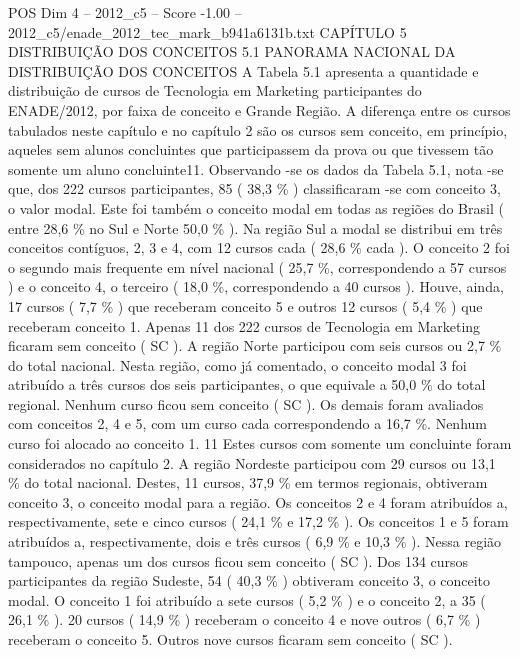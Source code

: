 \begin{textsample}{POS Dim 4 – 2012\_c5 – Score -1.00 – 2012\_c5/enade\_2012\_tec\_mark\_b941a6131b.txt}  \label{ex:f4_pos_252}
CAPÍTULO 5 DISTRIBUIÇÃO DOS CONCEITOS 5.1 PANORAMA NACIONAL DA DISTRIBUIÇÃO DOS CONCEITOS A Tabela 5.1 apresenta a quantidade e distribuição de cursos de Tecnologia em Marketing participantes do ENADE/2012, por faixa de conceito e Grande Região.
A diferença entre os cursos tabulados neste capítulo e no capítulo 2 são os cursos sem conceito, em princípio, aqueles sem alunos concluintes que participassem da prova ou que tivessem tão somente um aluno concluinte11.
Observando -se os dados da Tabela 5.1, nota -se que, dos 222 cursos participantes, 85 ( 38,3 \% ) classificaram -se com conceito 3, o valor modal.
Este foi também o conceito modal em todas as regiões do Brasil ( entre 28,6 \% no Sul e Norte 50,0 \% ).
Na região Sul a modal se distribui em três conceitos contíguos, 2, 3 e 4, com 12 cursos cada ( 28,6 \% cada ).
O conceito 2 foi o segundo mais frequente em nível nacional ( 25,7 \%, correspondendo a 57 cursos ) e o conceito 4, o terceiro ( 18,0 \%, correspondendo a 40 cursos ).
Houve, ainda, 17 cursos ( 7,7 \% ) que receberam conceito 5 e outros 12 cursos ( 5,4 \% ) que receberam conceito 1.
Apenas 11 dos 222 cursos de Tecnologia em Marketing ficaram sem conceito ( SC ).
A região Norte participou com seis cursos ou 2,7 \% do total nacional.
Nesta região, como já comentado, o conceito modal 3 foi atribuído a três cursos dos seis participantes, o que equivale a 50,0 \% do total regional.
Nenhum curso ficou sem conceito ( SC ).
Os demais foram avaliados com conceitos 2, 4 e 5, com um curso cada correspondendo a 16,7 \%.
Nenhum curso foi alocado ao conceito 1. 11 Estes cursos com somente um concluinte foram considerados no capítulo 2.
A região Nordeste participou com 29 cursos ou 13,1 \% do total nacional.
Destes, 11 cursos, 37,9 \% em termos regionais, obtiveram conceito 3, o conceito modal para a região.
Os conceitos 2 e 4 foram atribuídos a, respectivamente, sete e cinco cursos ( 24,1 \% e 17,2 \% ).
Os conceitos 1 e 5 foram atribuídos a, respectivamente, dois e três cursos ( 6,9 \% e 10,3 \% ).
Nessa região tampouco, apenas um dos cursos ficou sem conceito ( SC ).
Dos 134 cursos participantes da região Sudeste, 54 ( 40,3 \% ) obtiveram conceito 3, o conceito modal.
O conceito 1 foi atribuído a sete cursos ( 5,2 \% ) e o conceito 2, a 35 ( 26,1 \% ). 20 cursos ( 14,9 \% ) receberam o conceito 4 e nove outros ( 6,7 \% ) receberam o conceito 5.
Outros nove cursos ficaram sem conceito ( SC ).

\end{textsample}
